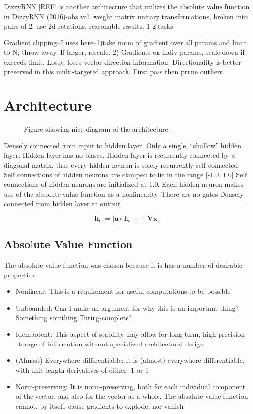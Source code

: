 \documentclass{article}
\begin{document}
DizzyRNN [REF] is another architecture that utilizes the absolute value function in 
DizzyRNN (2016)-abs val. weight matrix unitary transformations, broken into pairs of 2, use 2d rotations. reasonable results. 1-2 tasks 

Gradient clipping--2 uses here--1)take norm of gradient over all params and limit to N; throw away.  If larger, rescale.  2) Gradients on indiv params, scale down if exceeds limit.  Lossy, loses vector direction information. Directionality is better preserved in this multi-targeted approach. First pass then prune outliers.   

\section{Architecture}
\label{headings}
\begin{figure}[b]
  \centering
  
  \caption{Figure showing nice diagram of the architecture.}
\end{figure}

Densely connected from input to hidden layer.
Only a single, “shallow” hidden layer.
Hidden layer has no biases.
Hidden layer is recurrently connected by a diagonal matrix; thus every hidden neuron is solely recurrently self-connected.
Self connections of hidden neurons are clamped to lie in the range [-1.0, 1.0]
Self connections of hidden neurons are initialized at 1.0.
Each hidden neuron makes use of the absolute value function as a nonlinearity.
There are no gates
Densely connected from hidden layer to output

\begin{equation}
  \mathbf{h}_t := | \mathbf{u} \circ \mathbf{h}_{t-1} + \mathbf{Vx}_t |
\end{equation}

\subsection{Absolute Value Function}

The absolute value function was chosen because it is has a number of desirable properties: 

\begin{itemize}
\item Nonlinear: This is a requirement for useful computations to be possible
\item Unbounded: Can I make an argument for why this is an important thing? Something somthing Turing-complete?
\item Idempotent: This aspect of stability may allow for long term, high precision storage of information without specialized architectural design
\item (Almost) Everywhere differentiable: It is (almost) everywhere differentiable, with unit-length derivatives of either -1 or 1
\item Norm-preserving: It is norm-preserving, both for each individual component of the vector, and also for the vector as a whole.
The absolute value function cannot, by itself, cause gradients to explode, nor vanish
\end{itemize}
\end{document}
